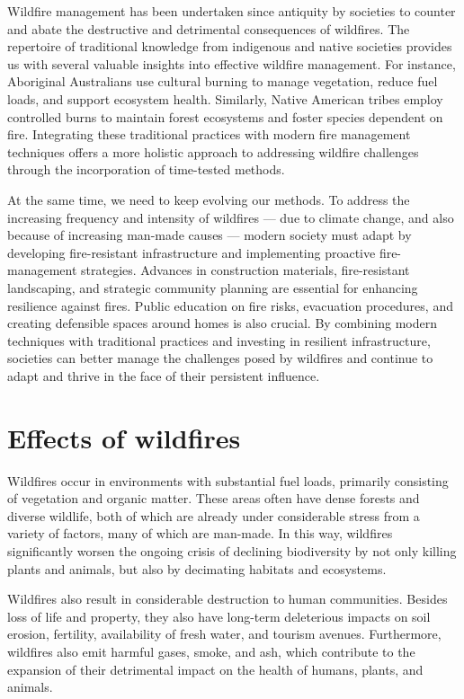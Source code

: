 \documentclass[
  12 pt,
]{Nemilov}
\begin{document}
Wildfire management has been undertaken since antiquity by societies to counter and abate the destructive and detrimental consequences of wildfires. The repertoire of traditional knowledge from indigenous and native societies provides us with several valuable insights into effective wildfire management. For instance, Aboriginal Australians use cultural burning to manage vegetation, reduce fuel loads, and support ecosystem health. Similarly, Native American tribes employ controlled burns to maintain forest ecosystems and foster species dependent on fire. Integrating these traditional practices with modern fire management techniques offers a more holistic approach to addressing wildfire challenges through the incorporation of time-tested methods.

At the same time, we need to keep evolving our methods. To address the increasing frequency and intensity of wildfires --- due to climate change, and also because of increasing man-made causes --- modern society must adapt by developing fire-resistant infrastructure and implementing proactive fire-management strategies. Advances in construction materials, fire-resistant landscaping, and strategic community planning are essential for enhancing resilience against fires. Public education on fire risks, evacuation procedures, and creating defensible spaces around homes is also crucial. By combining modern techniques with traditional practices and investing in resilient infrastructure, societies can better manage the challenges posed by wildfires and continue to adapt and thrive in the face of their persistent influence.

\chapter{Effects of wildfires}\label{effects-of-wildfires}

Wildfires occur in environments with substantial fuel loads, primarily consisting of vegetation and organic matter. These areas often have dense forests and diverse wildlife, both of which are already under considerable stress from a variety of factors, many of which are man-made. In this way, wildfires significantly worsen the ongoing crisis of declining biodiversity by not only killing plants and animals, but also by decimating habitats and ecosystems.

Wildfires also result in considerable destruction to human communities. Besides loss of life and property, they also have long-term deleterious impacts on soil erosion, fertility, availability of fresh water, and tourism avenues. Furthermore, wildfires also emit harmful gases, smoke, and ash, which contribute to the expansion of their detrimental impact on the health of humans, plants, and animals.
\end{document}
